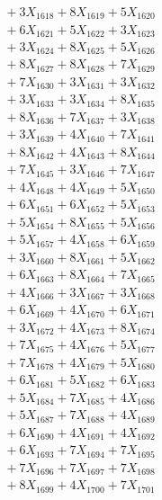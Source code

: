 \documentclass[a4paper,10pt]{article}
\begin{document}
{\begin{align}
&\;  + 3 X_{1618} + 8 X_{1619} + 5 X_{1620} \\[0.3ex]
&\;  + 6 X_{1621} + 5 X_{1622} + 3 X_{1623} \\[0.3ex]
&\;  + 3 X_{1624} + 8 X_{1625} + 5 X_{1626} \\[0.3ex]
&\;  + 8 X_{1627} + 8 X_{1628} + 7 X_{1629} \\[0.5ex]\allowbreak
&\;  + 7 X_{1630} + 3 X_{1631} + 3 X_{1632} \\[0.3ex]
&\;  + 3 X_{1633} + 3 X_{1634} + 8 X_{1635} \\[0.3ex]
&\;  + 8 X_{1636} + 7 X_{1637} + 3 X_{1638} \\[0.3ex]
&\;  + 3 X_{1639} + 4 X_{1640} + 7 X_{1641} \\[0.3ex]
&\;  + 8 X_{1642} + 4 X_{1643} + 8 X_{1644} \\[0.3ex]
&\;  + 7 X_{1645} + 3 X_{1646} + 7 X_{1647} \\[0.3ex]
&\;  + 4 X_{1648} + 4 X_{1649} + 5 X_{1650} \\[0.3ex]
&\;  + 6 X_{1651} + 6 X_{1652} + 5 X_{1653} \\[0.3ex]
&\;  + 5 X_{1654} + 8 X_{1655} + 5 X_{1656} \\[0.3ex]
&\;  + 5 X_{1657} + 4 X_{1658} + 6 X_{1659} \\[0.5ex]\allowbreak
&\;  + 3 X_{1660} + 8 X_{1661} + 5 X_{1662} \\[0.3ex]
&\;  + 6 X_{1663} + 8 X_{1664} + 7 X_{1665} \\[0.3ex]
&\;  + 4 X_{1666} + 3 X_{1667} + 3 X_{1668} \\[0.3ex]
&\;  + 6 X_{1669} + 4 X_{1670} + 6 X_{1671} \\[0.3ex]
&\;  + 3 X_{1672} + 4 X_{1673} + 8 X_{1674} \\[0.3ex]
&\;  + 7 X_{1675} + 4 X_{1676} + 5 X_{1677} \\[0.3ex]
&\;  + 7 X_{1678} + 4 X_{1679} + 5 X_{1680} \\[0.3ex]
&\;  + 6 X_{1681} + 5 X_{1682} + 6 X_{1683} \\[0.3ex]
&\;  + 5 X_{1684} + 7 X_{1685} + 4 X_{1686} \\[0.3ex]
&\;  + 5 X_{1687} + 7 X_{1688} + 4 X_{1689} \\[0.5ex]\allowbreak
&\;  + 6 X_{1690} + 4 X_{1691} + 4 X_{1692} \\[0.3ex]
&\;  + 6 X_{1693} + 7 X_{1694} + 7 X_{1695} \\[0.3ex]
&\;  + 7 X_{1696} + 7 X_{1697} + 7 X_{1698} \\[0.3ex]
&\;  + 8 X_{1699} + 4 X_{1700} + 7 X_{1701} \\[0.3ex]

\end{align}}
\end{document}
